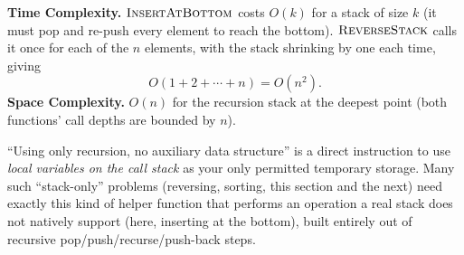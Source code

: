 \begin{complexitybox}
\textbf{Time Complexity.} $\textsc{InsertAtBottom}$ costs $O(k)$ for a
stack of size $k$ (it must pop and re-push every element to reach the
bottom). $\textsc{ReverseStack}$ calls it once for each of the $n$
elements, with the stack shrinking by one each time, giving
\[
  O(1+2+\cdots+n) = O(n^2).
\]
\textbf{Space Complexity.} $O(n)$ for the recursion stack at the deepest
point (both functions' call depths are bounded by $n$).
\end{complexitybox}

\begin{takeawaybox}
``Using only recursion, no auxiliary data structure'' is a direct
instruction to use \emph{local variables on the call stack} as your only
permitted temporary storage. Many such ``stack-only'' problems
(reversing, sorting, this section and the next) need exactly this kind of
helper function that performs an operation a real stack does not natively
support (here, inserting at the bottom), built entirely out of recursive
pop/push/recurse/push-back steps.
\end{takeawaybox}
